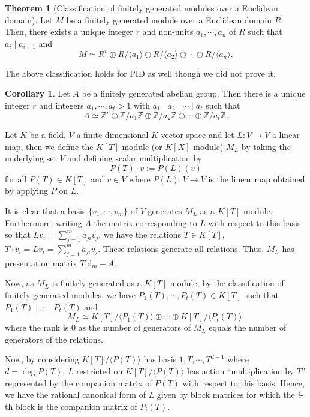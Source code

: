 \documentclass[]{article}
\theoremstyle{definition}
\newtheorem*{theorem}{Theorem}
\newtheorem*{corollary}{Corollary}
\begin{document}
\begin{theorem}[Classification of finitely generated modules over a Euclidean domain]
  Let \(M\) be a finitely generated module over a Euclidean domain \(R\). Then, there 
  exists a unique integer \(r\) and non-units \(a_1, \cdots, a_n\) of \(R\) such that 
  \(a_i \mid a_{i + 1}\) and 
  \[M \simeq R^r \oplus R / \langle a_1 \rangle \oplus R / \langle a_2 \rangle 
    \oplus \cdots \oplus R / \langle a_n \rangle.\] 
\end{theorem}
The above classification holds for PID as well though we did not prove it.

\begin{corollary}
  Let \(A\) be a finitely generated abelian group. Then there is a unique integer 
  \(r\) and integers \(a_1, \cdots, a_t > 1\) with \(a_1 \mid a_2 \mid \cdots \mid a_t\) 
  such that 
  \[A \simeq \mathbb{Z}^r \oplus \mathbb{Z} / a_1\mathbb{Z} \oplus \mathbb{Z} / a_2\mathbb{Z} 
    \oplus \cdots \oplus \mathbb{Z} / a_t\mathbb{Z}.\]
\end{corollary}

Let \(K\) be a field, \(V\) a finite dimensional \(K\)-vector space and let \(L : V \to V\) 
a linear map, then we define the \(K[T]\)-module (or \(K[X]\)-module) \(M_L\) by taking 
the underlying set \(V\) and defining scalar multiplication by 
\[P(T) \cdot v := P(L)(v)\]
for all \(P(T) \in K[T]\) and \(v \in V\) where \(P(L) : V \to V\) is the linear map 
obtained by applying \(P\) on \(L\).

It is clear that a basis \(\{v_1, \cdots, v_m\}\) of \(V\) generates \(M_L\) as a 
\(K[T]\)-module. Furthermore, writing \(A\) the matrix corresponding to \(L\) with 
respect to this basis so that \(Lv_i = \sum_{j = 1}^m a_{ji} v_j\), we have the relations 
\(T \in K[T]\), \(T \cdot v_i = L v_i = \sum_{j = 1}^m a_{ji} v_j\). These relations 
generate all relations. Thus, \(M_L\) has presentation matrix \(T \text{id}_m - A\).

Now, as \(M_L\) is finitely generated as a \(K[T]\)-module, by the classification of 
finitely generated modules, we have \(P_1(T), \cdots, P_t(T) \in K[T]\) such that 
\(P_1(T) \mid \cdots \mid P_t(T)\) and 
\[M_L \simeq K[T] / \langle P_1(T) \rangle \oplus \cdots \oplus K[T] / \langle P_t(T) \rangle.\]
where the rank is 0 as the number of generators of \(M_L\) equals the number of 
generators of the relations.

Now, by considering \(K[T] / \langle P(T) \rangle\) has basis \(1, T, \cdots, T^{d - 1}\) where 
\(d = \deg P(T)\), \(L\) restricted on \(K[T] / \langle P(T) \rangle\) has action 
``multiplication by \(T\)'' represented by the companion matrix of \(P(T)\) with respect 
to this basis. Hence, we have the rational canonical form of \(L\) given by 
block matrices for which the \(i\)-th block is the companion matrix of \(P_i(T)\).
\end{document}
